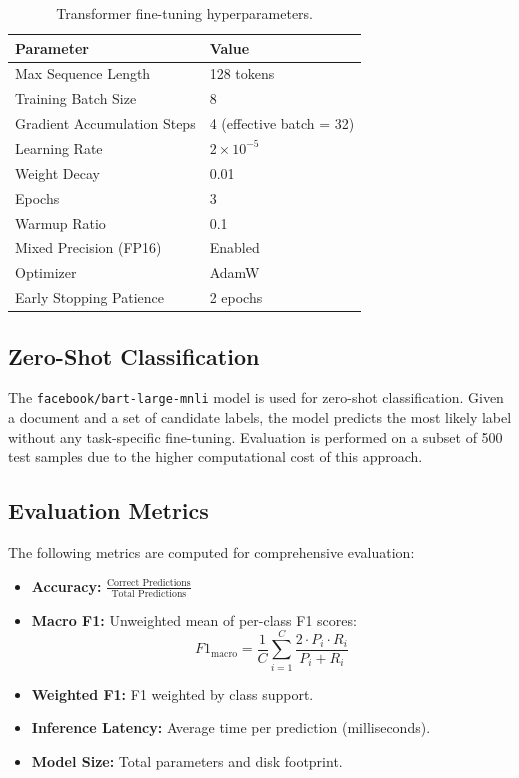 \documentclass[12pt, a4paper]{article}
\begin{document}
\begin{table}[H]
    \centering
    \caption{Transformer fine-tuning hyperparameters.}
    \label{tab:hyperparams}
    \begin{tabular}{ll}
        \toprule
        \textbf{Parameter} & \textbf{Value} \\
        \midrule
        Max Sequence Length & 128 tokens \\
        Training Batch Size & 8 \\
        Gradient Accumulation Steps & 4 (effective batch = 32) \\
        Learning Rate & $2 \times 10^{-5}$ \\
        Weight Decay & 0.01 \\
        Epochs & 3 \\
        Warmup Ratio & 0.1 \\
        Mixed Precision (FP16) & Enabled \\
        Optimizer & AdamW \\
        Early Stopping Patience & 2 epochs \\
        \bottomrule
    \end{tabular}
\end{table}

\subsection{Zero-Shot Classification}
The \texttt{facebook/bart-large-mnli} model is used for zero-shot classification. Given a document and a set of candidate labels, the model predicts the most likely label without any task-specific fine-tuning. Evaluation is performed on a subset of 500 test samples due to the higher computational cost of this approach.

\subsection{Evaluation Metrics}
The following metrics are computed for comprehensive evaluation:
\begin{itemize}
    \item \textbf{Accuracy:} $\frac{\text{Correct Predictions}}{\text{Total Predictions}}$
    \item \textbf{Macro F1:} Unweighted mean of per-class F1 scores:
    \begin{equation}
        F1_{\text{macro}} = \frac{1}{C}\sum_{i=1}^{C} \frac{2 \cdot P_i \cdot R_i}{P_i + R_i}
    \end{equation}
    \item \textbf{Weighted F1:} F1 weighted by class support.
    \item \textbf{Inference Latency:} Average time per prediction (milliseconds).
    \item \textbf{Model Size:} Total parameters and disk footprint.
\end{itemize}
\end{document}
